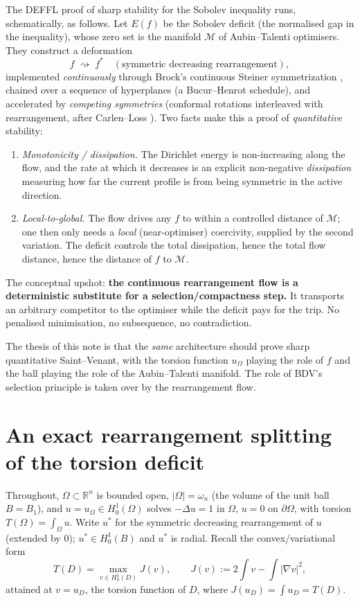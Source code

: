 \documentclass[11pt]{article}
\theoremstyle{definition}
\newcommand{\R}{\mathbb R}
\newcommand{\Om}{\Omega}
\begin{document}
The DEFFL proof of sharp stability for the Sobolev inequality \cite{DEFFL}
runs, schematically, as follows. Let $E(f)$ be the Sobolev deficit (the
normalised gap in the inequality), whose zero set is the manifold $\mathcal
M$ of Aubin--Talenti optimisers. They construct a deformation
\[
   f \;\rightsquigarrow\; f^* \quad(\text{symmetric decreasing rearrangement}),
\]
implemented \emph{continuously} through Brock's continuous Steiner
symmetrization \cite{Brock1,Brock2}, chained over a sequence of hyperplanes
(a Bucur--Henrot schedule), and accelerated by \emph{competing symmetries}
(conformal rotations interleaved with rearrangement, after Carlen--Loss
\cite{CarlenLoss}). Two facts make this a proof of \emph{quantitative}
stability:
\begin{enumerate}[label=\textup{(\roman*)}]
\item \emph{Monotonicity / dissipation.} The Dirichlet energy is
non-increasing along the flow, and the rate at which it decreases is an
explicit non-negative \emph{dissipation} measuring how far the current
profile is from being symmetric in the active direction.
\item \emph{Local-to-global.} The flow drives any $f$ to within a
controlled distance of $\mathcal M$; one then only needs a \emph{local}
(near-optimiser) coercivity, supplied by the second variation. The deficit
controls the total dissipation, hence the total flow distance, hence the
distance of $f$ to $\mathcal M$.
\end{enumerate}
The conceptual upshot: \textbf{the continuous rearrangement flow is a
deterministic substitute for a selection/compactness step.} It transports an
arbitrary competitor to the optimiser while the deficit pays for the trip.
No penalised minimisation, no subsequence, no contradiction.

The thesis of this note is that the \emph{same} architecture should prove
sharp quantitative Saint--Venant, with the torsion function $u_\Om$ playing
the role of $f$ and the ball playing the role of the Aubin--Talenti manifold.
The role of BDV's selection principle is taken over by the rearrangement
flow.

\section{An exact rearrangement splitting of the torsion deficit}
\label{sec:splitting}

Throughout, $\Om\subset\R^n$ is bounded open, $|\Om|=\omega_n$ (the volume of
the unit ball $B=B_1$), and $u=u_\Om\in H^1_0(\Om)$ solves $-\Delta u=1$ in
$\Om$, $u=0$ on $\partial\Om$, with torsion $T(\Om)=\int_\Om u$. Write
$u^*$ for the symmetric decreasing rearrangement of $u$ (extended by $0$);
$u^*\in H^1_0(B)$ and $u^*$ is radial. Recall the convex/variational form
\[
   T(D)=\max_{v\in H^1_0(D)}J(v),\qquad J(v):=2\!\int v-\!\int|\nabla v|^2,
\]
attained at $v=u_D$, the torsion function of $D$, where $J(u_D)=\int u_D=T(D)$.
\end{document}
